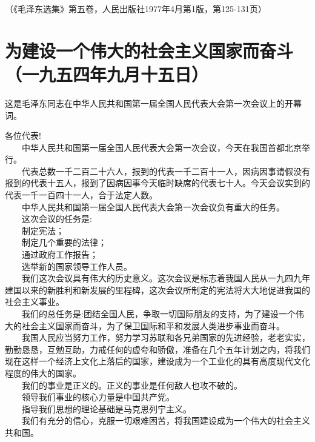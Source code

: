 \documentclass[cn,11pt,chinese]{elegantbook}
\def\myformat#1{\hfil\hfil #1}
\begin{document}
\begin{flushright}（《毛泽东选集》第五卷，人民出版社1977年4月第1版，第125-131页）\end{flushright}
\newpage\section*{\myformat{为建设一个伟大的社会主义国家而奋斗}\\\myformat{（一九五四年九月十五日）}}
\begin{introduction}\item  这是毛泽东同志在中华人民共和国第一届全国人民代表大会第一次会议上的开幕词。\end{introduction}
各位代表!\\
　　中华人民共和国第一届全国人民代表大会第一次会议，今天在我国首都北京举行。\\
　　代表总数一千二百二十六人，报到的代表一千二百十一人，因病因事请假没有报到的代表十五人，报到了因病因事今天临时缺席的代表七十人。今天会议实到的代表一千一百四十一人，合于法定人数。\\
　　中华人民共和国第一届全国人民代表大会第一次会议负有重大的任务。\\
　　这次会议的任务是:\\
　　制定宪法；\\
　　制定几个重要的法律；\\
　　通过政府工作报告；\\
　　选举新的国家领导工作人员。\\
　　我们这次会议具有伟大的历史意义。这次会议是标志着我国人民从一九四九年建国以来的新胜利和新发展的里程碑，这次会议所制定的宪法将大大地促进我国的社会主义事业。\\
　　我们的总任务是:团结全国人民，争取一切国际朋友的支持，为了建设一个伟大的社会主义国家而奋斗，为了保卫国际和平和发展人类进步事业而奋斗。\\
　　我国人民应当努力工作，努力学习苏联和各兄弟国家的先进经验，老老实实，勤勤恳恳，互勉互助，力戒任何的虚夸和骄傲，准备在几个五年计划之内，将我们现在这样一个经济上文化上落后的国家，建设成为一个工业化的具有高度现代文化程度的伟大的国家。\\
　　我们的事业是正义的。正义的事业是任何敌人也攻不破的。\\
　　领导我们事业的核心力量是中国共产党。\\
　　指导我们思想的理论基础是马克思列宁主义。\\
　　我们有充分的信心，克服一切艰难困苦，将我国建设成为一个伟大的社会主义共和国。\\
\end{document}
